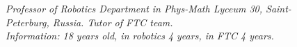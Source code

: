 \begin{figure}[H]
\begin{minipage}{0.47\linewidth}
		\emph{Professor of Robotics Department in Phys-Math Lyceum 30, Saint-Peterburg, Russia. Tutor of FTC team. \\}
		\emph{Information: 18 years old, in robotics 4 years, in FTC 4 years.}
	\end{minipage}
	\hfill
	\begin{minipage}[h]{0.47\linewidth}
		\\
	\end{minipage}	
\end{figure}

\fillpage

